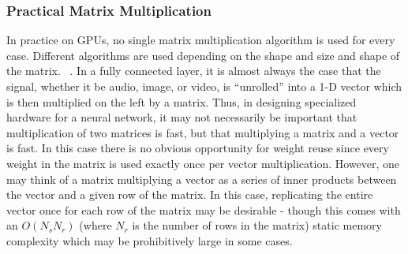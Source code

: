 \subsubsection{Practical Matrix Multiplication}
In practice on GPUs, no single matrix multiplication algorithm is used for every case.  Different algorithms are used depending on the shape and size and shape of the matrix. ~\cite{DBLP:journals/corr/ChetlurWVCTCS14}.  In a fully connected layer, it is almost always the case that the signal, whether it be audio, image, or video, is ``unrolled'' into a 1-D vector which is then multiplied on the left by a matrix.  Thus, in designing specialized hardware for a neural network, it may not necessarily be important that multiplication of two matrices is fast, but that multiplying a matrix and a vector is fast.  In this case there is no obvious opportunity for weight reuse since every weight in the matrix is used exactly once per vector multiplication.  However, one may think of a matrix multiplying a vector as a series of inner products between the vector and a given row of the matrix.  In this case, replicating the entire vector once for each row of the matrix may be desirable - though this comes with an $O(N_s N_r)$ (where $N_r$ is the number of rows in the matrix) static memory complexity which may be prohibitively large in some cases.
